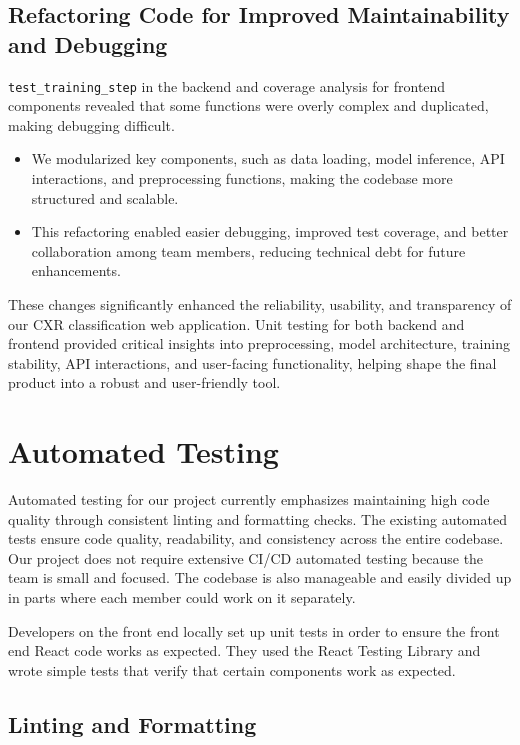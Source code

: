 \documentclass[12pt, titlepage]{article}
\begin{document}
\subsection{Refactoring Code for Improved Maintainability and Debugging}

\texttt{test\_training\_step} in the backend and coverage analysis for frontend components revealed that some functions were overly complex and duplicated, making debugging difficult.
\begin{itemize}
    \item We modularized key components, such as data loading, model inference, API interactions, and preprocessing functions, making the codebase more structured and scalable.
    \item This refactoring enabled easier debugging, improved test coverage, and better collaboration among team members, reducing technical debt for future enhancements.
\end{itemize}

These changes significantly enhanced the reliability, usability, and transparency of our CXR classification web application. Unit testing for both backend and frontend provided critical insights into preprocessing, model architecture, training stability, API interactions, and user-facing functionality, helping shape the final product into a robust and user-friendly tool.


\section{Automated Testing}
Automated testing for our project currently emphasizes maintaining high code quality through consistent linting and formatting checks. The existing automated tests ensure code quality, readability, and consistency across the entire codebase. Our project does not require extensive CI/CD automated testing because the team is small and focused. The codebase is also manageable and easily divided up in parts where each member could work on it separately.

Developers on the front end locally set up unit tests in order to ensure the front end React code works as expected. They used the React Testing Library and wrote simple tests that verify that certain components work as expected.

\subsection{Linting and Formatting}
\end{document}
